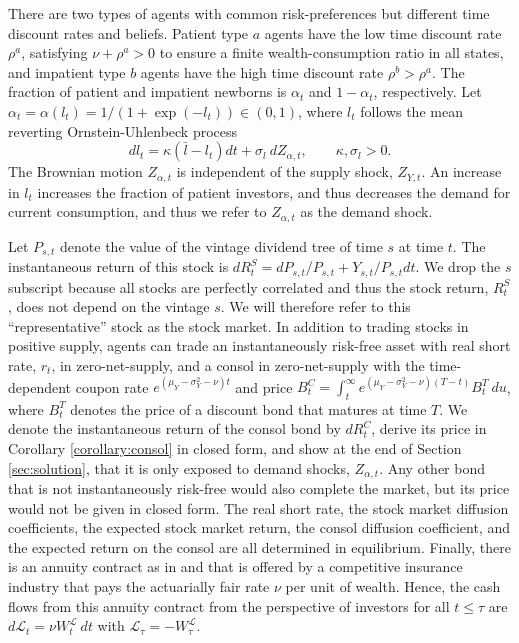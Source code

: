 \documentclass[preprint,11pt,authoryear]{elsarticle}
\theoremstyle{plain}
\begin{document}
There are two types of agents with common risk-preferences but different time discount rates and beliefs. Patient type $a$ agents have the low time discount rate $\rho^a$, satisfying $\nu + \rho^a>0$ to ensure a finite wealth-consumption ratio in all states, and impatient type $b$ agents have the high time discount rate $\rho^b > \rho^a$.  The fraction of patient and impatient newborns is $\alpha_t$ and $1-\alpha_t$, respectively. Let $\alpha_t = \alpha(l_t) = 1/(1+\exp(-l_t))\in \left(0,1\right)$, where $l_t$ follows the mean reverting Ornstein-Uhlenbeck process
\begin{equation}\label{l_dynamics}
	dl_t = \kappa \left(\bar{l} - l_t\right)dt + \sigma_{l}\: dZ_{\alpha,t}, \qquad \kappa, \sigma_l >0.
\end{equation}
The Brownian motion $Z_{\alpha,t}$ is independent of the supply shock, $Z_{Y,t}$. An increase in $l_t$ increases the fraction of patient investors, and thus decreases the demand for current consumption, and thus we refer to $Z_{\alpha,t}$ as the demand shock. %

Let $P_{s,t}$ denote the value of the vintage dividend tree of time $s$ at time $t$. The instantaneous return of this stock is $dR^S_{t} = dP_{s,t}/P_{s,t} + Y_{s,t}/P_{s,t} dt$.
We drop the $s$ subscript because all stocks are perfectly correlated and thus the stock return, $R^S_{t}$, does not depend on the vintage $s$.  We will therefore refer to this ``representative'' stock as the stock market. In addition to trading stocks in positive supply, agents can trade an instantaneously risk-free asset with real short rate, $r_t$, in zero-net-supply, and a consol in zero-net-supply with the time-dependent coupon rate $e^{(\mu_Y - \sigma_Y^2 - \nu)  t}$ and price $B^{C}_t =  \int_{t}^{\infty} e^{(\mu_Y - \sigma_Y^2 - \nu) (T-t)} B^{T}_{t} \: du $, %
where $B^{T}_{t} $ denotes the price of a discount bond that matures at time $T$. We denote the instantaneous return of the consol bond by $dR^{C}_t$, derive its price in Corollary \ref{corollary:consol} in closed form, and show at the end of Section \ref{sec:solution}, that it is only exposed to demand shocks, $Z_{\alpha,t}$. Any other bond that is not instantaneously risk-free would also complete the market, but its price would not be given in closed form. The real short rate, the stock market diffusion coefficients, the expected stock market return, the consol diffusion coefficient, and the expected return on the consol are all determined in equilibrium.  Finally, there is an annuity contract as in \cite{Blanchard2013} and \cite{Garleanu2008} that is offered by a competitive insurance industry that pays the actuarially fair rate $\nu$ per unit of wealth. Hence, the cash flows from this annuity contract from the perspective of investors for all $t \leq \tau$ are $ d \mathcal{L}_t =  \nu W^\mathcal{L}_{t} \: dt$ with $\mathcal{L}_{\tau} = -W^{\mathcal{L}}_{\tau}$.
\end{document}
